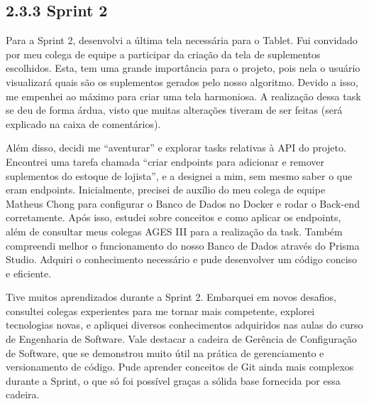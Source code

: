 \hypertarget{__RefHeading___Toc4747_3118176633}{}
\subsection*{2.3.3 Sprint 2\originalspace{}}
\label{unit:ages-i-sprint-2}

\indent \originaltab{}Para a Sprint 2, desenvolvi a última tela necessária para o Tablet. Fui convidado por meu colega de equipe a participar da criação da tela de suplementos escolhidos. Esta, tem uma grande importância para o projeto, pois nela o usuário visualizará quais são os suplementos gerados pelo nosso algoritmo. Devido a isso, me empenhei ao máximo para criar uma tela harmoniosa. A realização dessa task se deu de forma árdua, visto que muitas alterações tiveram de ser feitas (será explicado na caixa de comentários).\originalspace{}

\indent \originaltab{}Além disso, decidi me “aventurar” e explorar tasks relativas à API do projeto. Encontrei uma tarefa chamada “criar endpoints para adicionar e remover suplementos do estoque de lojista”, e a designei a mim, sem mesmo saber o que eram endpoints. Inicialmente, precisei de auxílio do meu colega de equipe Matheus Chong para configurar o Banco de Dados no Docker e rodar o Back-end corretamente. Após isso, estudei sobre conceitos e como aplicar os endpoints, além de consultar meus colegas AGES III para a realização da task. Também compreendi melhor o funcionamento do nosso Banco de Dados através do Prisma Studio. Adquiri o conhecimento necessário e pude desenvolver um código conciso e eficiente.

\indent \originaltab{}Tive muitos aprendizados durante a Sprint 2. Embarquei em novos desafios, consultei colegas experientes para me tornar mais competente, explorei tecnologias novas, e apliquei diversos conhecimentos adquiridos nas aulas do curso de Engenharia de Software. Vale destacar a cadeira de Gerência de Configuração de Software, que se demonstrou muito útil na prática de gerenciamento e versionamento de código. Pude aprender conceitos de Git ainda mais complexos durante a Sprint, o que só foi possível graças a sólida base fornecida por essa cadeira.


